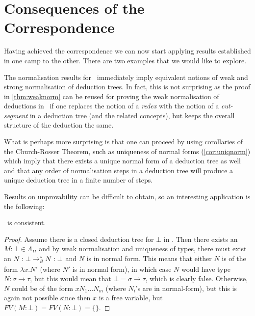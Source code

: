 \section{Consequences of the Correspondence}

Having achieved the correspondence we can now start applying results
established in one camp to the other. There are two examples that we would like
to explore.

The normalisation results for \stlambda\ immediately imply equivalent notions
of weak and strong normalisation of deduction trees. In fact, this is not
surprising as the proof in \ref{thm:weaknorm} can be reused for proving the
weak normalisation of deductions in \implnpi\ if one replaces the notion of a
\emph{redex} with the notion of a \emph{cut-segment} in a deduction tree (and the
related concepts), but keeps the overall structure of the deduction the same.

What is perhaps more surprising is that one can proceed by using corollaries of
the Church-Rosser Theorem, such as uniqueness of normal forms
(\ref{cor:uniqnorm}) which imply that there exists a unique normal form of a
deduction tree as well and that any order of normalisation steps in a
deduction tree will produce a unique deduction tree in a finite number of steps.

Results on unprovability can be difficult to obtain, so an interesting
application is the following:

\begin{proposition}\implnpi\ is consistent.\end{proposition}
\begin{proof}
    Assume there is a closed deduction tree for $\bot$ in \implnpi. Then there
    exists an $M\!:\!\bot \in \Lambda_\Pi$ and by weak normalisation and
    uniqueness of types, there must exist an $N:\bot \rightarrow_\beta^* N:\bot$ and $N$
    is in normal form. This means that either $N$ is of the form $\lambda x.
    N'$ (where $N'$ is in normal form), in which case $N$ would have type
    $N:\sigma\to\tau$, but this would mean that $\bot = \sigma\to\tau$, which
    is clearly false.  Otherwise, $N$ could be of the form $x N_1 \ldots N_m$
    (where $N_i$'s are in normal-form), but this is again not possible since
    then $x$ is a free variable, but $FV(M:\bot) = FV(N:\bot) = \{\}$.
\end{proof}
